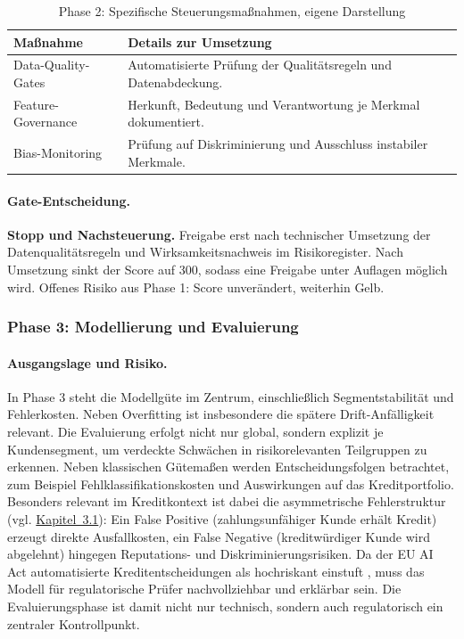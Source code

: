 \begin{table}[!htbp]
\centering
\begin{tabular}{|p{4cm}|p{8cm}|}
\hline
\textbf{Maßnahme} & \textbf{Details zur Umsetzung} \\
\hline
Data-Quality-Gates & Automatisierte Prüfung der Qualitätsregeln und Datenabdeckung. \\
Feature-Governance & Herkunft, Bedeutung und Verantwortung je Merkmal dokumentiert. \\
Bias-Monitoring & Prüfung auf Diskriminierung und Ausschluss instabiler Merkmale. \\
\hline
\end{tabular}
\caption{Phase 2: Spezifische Steuerungsmaßnahmen, eigene Darstellung}
\label{tab:cs1_phase2_massnahmen}
\end{table}

\paragraph*{Gate-Entscheidung.}
\textbf{Stopp und Nachsteuerung.} Freigabe erst nach technischer Umsetzung der
Datenqualitätsregeln und Wirksamkeitsnachweis im Risikoregister.
Nach Umsetzung sinkt der Score auf 300, sodass eine Freigabe unter Auflagen möglich wird.
Offenes Risiko aus Phase 1: Score unverändert, weiterhin Gelb.

\subsubsection{Phase 3: Modellierung und Evaluierung}
\paragraph*{Ausgangslage und Risiko.}
In Phase 3 steht die Modellgüte im Zentrum, einschließlich Segmentstabilität und Fehlerkosten.
Neben Overfitting ist insbesondere die spätere Drift-Anfälligkeit relevant.
Die Evaluierung erfolgt nicht nur global, sondern explizit je Kundensegment,
um verdeckte Schwächen in risikorelevanten Teilgruppen zu erkennen.
Neben klassischen Gütemaßen werden Entscheidungsfolgen betrachtet,
zum Beispiel Fehlklassifikationskosten und Auswirkungen auf das Kreditportfolio.
Besonders relevant im Kreditkontext ist dabei die asymmetrische Fehlerstruktur
(vgl. \hyperref[sec:methode1]{Kapitel~3.1}):
Ein False Positive (zahlungsunfähiger Kunde erhält Kredit) erzeugt direkte Ausfallkosten,
ein False Negative (kreditwürdiger Kunde wird abgelehnt) hingegen
Reputations- und Diskriminierungsrisiken.
Da der EU AI Act automatisierte Kreditentscheidungen als hochriskant einstuft \cite{EUAIAct2024},
muss das Modell für regulatorische Prüfer nachvollziehbar und erklärbar sein.
Die Evaluierungsphase ist damit nicht nur technisch, sondern auch regulatorisch ein zentraler Kontrollpunkt.

